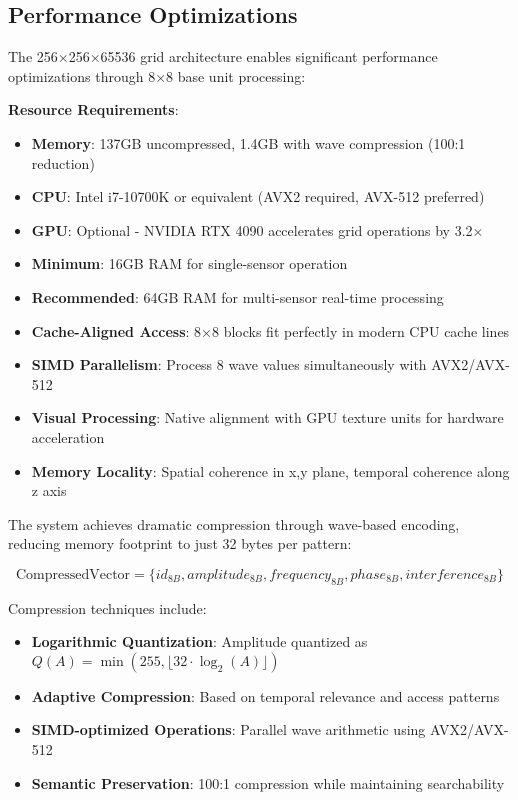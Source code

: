 \documentclass[11pt,letterpaper]{article}
\begin{document}
\subsection{Performance Optimizations}

The 256×256×65536 grid architecture enables significant performance optimizations through 8×8 base unit processing:

\textbf{Resource Requirements}:
\begin{itemize}
\item \textbf{Memory}: 137GB uncompressed, 1.4GB with wave compression (100:1 reduction)
\item \textbf{CPU}: Intel i7-10700K or equivalent (AVX2 required, AVX-512 preferred)
\item \textbf{GPU}: Optional - NVIDIA RTX 4090 accelerates grid operations by 3.2×
\item \textbf{Minimum}: 16GB RAM for single-sensor operation
\item \textbf{Recommended}: 64GB RAM for multi-sensor real-time processing
\end{itemize}

\begin{itemize}
\item \textbf{Cache-Aligned Access}: 8×8 blocks fit perfectly in modern CPU cache lines
\item \textbf{SIMD Parallelism}: Process 8 wave values simultaneously with AVX2/AVX-512
\item \textbf{Visual Processing}: Native alignment with GPU texture units for hardware acceleration
\item \textbf{Memory Locality}: Spatial coherence in x,y plane, temporal coherence along z axis
\end{itemize}

The system achieves dramatic compression through wave-based encoding, reducing memory footprint to just 32 bytes per pattern:

\begin{equation}
\text{CompressedVector} = \{id_{8B}, amplitude_{8B}, frequency_{8B}, phase_{8B}, interference_{8B}\}
\end{equation}

Compression techniques include:
\begin{itemize}
\item \textbf{Logarithmic Quantization}: Amplitude quantized as $Q(A) = \min(255, \lfloor 32 \cdot \log_2(A) \rfloor)$
\item \textbf{Adaptive Compression}: Based on temporal relevance and access patterns
\item \textbf{SIMD-optimized Operations}: Parallel wave arithmetic using AVX2/AVX-512
\item \textbf{Semantic Preservation}: 100:1 compression while maintaining searchability
\end{itemize}
\end{document}
